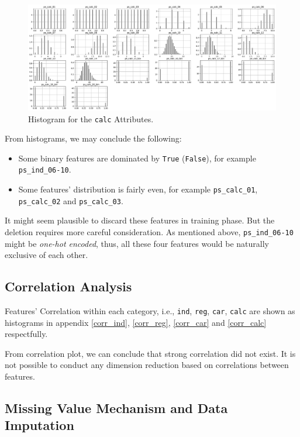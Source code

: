 \documentclass{standalone}
\begin{document}
\begin{figure}[!ht]
\centering
\includegraphics[width=\textwidth]{fig/calc_col.pdf}
\caption{Histogram for the \lstinline{calc} Attributes.}
\label{hist_calc}
\end{figure}

From histograms, we may conclude the following:
\begin{itemize}
    \item Some binary features are dominated by \lstinline{True}
        (\lstinline{False}), for example \lstinline{ps_ind_06-10}.
    \item Some features' distribution is fairly even, for example
        \lstinline{ps_calc_01}, \lstinline{ps_calc_02} and
        \lstinline{ps_calc_03}.
\end{itemize}

It might seem plausible to discard these features in training phase. But the
deletion requires more careful consideration. As mentioned above,
\lstinline{ps_ind_06-10} might be \emph{one-hot encoded}, thus, all these four
features would be naturally exclusive of each other.

\subsection{Correlation Analysis}

Features' Correlation within each category, i.e., \lstinline{ind},
\lstinline{reg}, \lstinline{car}, \lstinline{calc} are shown as histograms in
appendix \cref{corr_ind}, \cref{corr_reg}, \cref{corr_car} and \cref{corr_calc}
respectfully.

From correlation plot, we can conclude that strong correlation did not exist.
It is not possible to conduct any dimension reduction based on correlations
between features.

\subsection{Missing Value Mechanism and Data Imputation}
\end{document}
